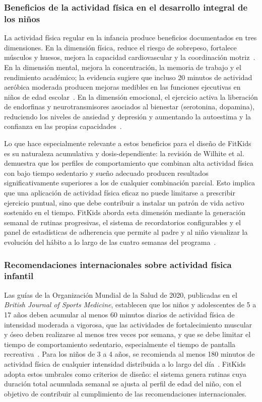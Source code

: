 				\subsubsection{Beneficios de la actividad física en el desarrollo integral de los niños}
					La actividad física regular en la infancia produce beneficios documentados en tres dimensiones. En la dimensión física, reduce el riesgo de sobrepeso, fortalece músculos y huesos, mejora la capacidad cardiovascular y la coordinación motriz~\cite{Wilhite2023}. En la dimensión mental, mejora la concentración, la memoria de trabajo y el rendimiento académico; la evidencia sugiere que incluso 20 minutos de actividad aeróbica moderada producen mejoras medibles en las funciones ejecutivas en niños de edad escolar~\cite{Wilhite2023}. En la dimensión emocional, el ejercicio activa la liberación de endorfinas y neurotransmisores asociados al bienestar (serotonina, dopamina), reduciendo los niveles de ansiedad y depresión y aumentando la autoestima y la confianza en las propias capacidades~\cite{Musa2022}.
					
					Lo que hace especialmente relevante a estos beneficios para el diseño de FitKids es su naturaleza acumulativa y dosis-dependiente: la revisión de Wilhite et al.~\cite{Wilhite2023} demuestra que los perfiles de comportamiento que combinan alta actividad física con bajo tiempo sedentario y sueño adecuado producen resultados significativamente superiores a los de cualquier combinación parcial. Esto implica que una aplicación de actividad física eficaz no puede limitarse a prescribir ejercicio puntual, sino que debe contribuir a instalar un patrón de vida activo sostenido en el tiempo. FitKids aborda esta dimensión mediante la generación semanal de rutinas progresivas, el sistema de recordatorios configurables y el panel de estadísticas de adherencia que permite al padre y al niño visualizar la evolución del hábito a lo largo de las cuatro semanas del programa~\cite{Wilhite2023,Bull2020}.

				\subsubsection{Recomendaciones internacionales sobre actividad física infantil}
					Las guías de la Organización Mundial de la Salud de 2020, publicadas en el \textit{British Journal of Sports Medicine}, establecen que los niños y adolescentes de 5 a 17 años deben acumular al menos 60 minutos diarios de actividad física de intensidad moderada a vigorosa, que las actividades de fortalecimiento muscular y óseo deben realizarse al menos tres veces por semana, y que se debe limitar el tiempo de comportamiento sedentario, especialmente el tiempo de pantalla recreativa~\cite{Bull2020}. Para los niños de 3 a 4 años, se recomienda al menos 180 minutos de actividad física de cualquier intensidad distribuida a lo largo del día~\cite{Bull2020}. FitKids adopta estos umbrales como criterios de diseño: el sistema genera rutinas cuya duración total acumulada semanal se ajusta al perfil de edad del niño, con el objetivo de contribuir al cumplimiento de las recomendaciones internacionales.
					
